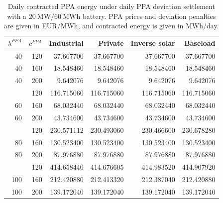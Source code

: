 \begin{table}[p]
\centering
\small
\caption{Daily contracted PPA energy under daily PPA deviation settlement with a $20~\mathrm{MW}/60~\mathrm{MWh}$ battery. PPA prices and deviation penalties are given in EUR/MWh, and contracted energy is given in MWh/day.}
\label{tab:contracted-energy-daily-p-20-e-60}
\begin{tabular*}{\textwidth}{@{\extracolsep{\fill}}rrrrrr@{}}
\toprule
$\lambda^{PPA}$ & $c^{PPA}$ & Industrial & Private & Inverse solar & Baseload \\
\midrule
40 & 120 & 37.667700 & 37.667700 & 37.667700 & 37.667700 \\
40 & 160 & 18.548460 & 18.548460 & 18.548460 & 18.548460 \\
40 & 200 & 9.642076 & 9.642076 & 9.642076 & 9.642076 \\
\addlinespace
60 & 120 & 116.715060 & 116.715060 & 116.715060 & 116.715060 \\
60 & 160 & 68.032440 & 68.032440 & 68.032440 & 68.032440 \\
60 & 200 & 43.734600 & 43.734600 & 43.734600 & 43.734600 \\
\addlinespace
80 & 120 & 230.571112 & 230.493060 & 230.466600 & 230.678280 \\
80 & 160 & 130.523400 & 130.523400 & 130.523400 & 130.523400 \\
80 & 200 & 87.976880 & 87.976880 & 87.976880 & 87.976880 \\
\addlinespace
100 & 120 & 414.658440 & 414.676605 & 414.983520 & 414.907920 \\
100 & 160 & 212.420880 & 212.413320 & 212.387040 & 212.420880 \\
100 & 200 & 139.172040 & 139.172040 & 139.172040 & 139.172040 \\
\bottomrule
\end{tabular*}
\end{table}
